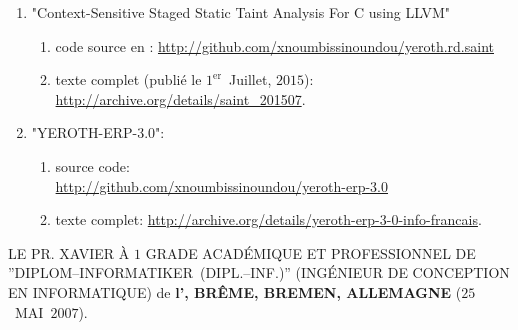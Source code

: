 \begin{enumerate}
	\item "Context-Sensitive Staged Static Taint Analysis
			For C using LLVM"
		\begin{enumerate}[1.]
			\itemsep -0.7em
			\item code source en \cplusplus: \url{http://github.com/xnoumbissinoundou/yeroth.rd.saint}
			\item texte complet (publié le $1^\text{er}$~Juillet, $2015$): \url{http://archive.org/details/saint_201507}.
		\end{enumerate}		 

	\item "YEROTH-ERP-3.0":
			\begin{enumerate}[1.]
			\itemsep -0.7em
			\item source code: \\
			\url{http://github.com/xnoumbissinoundou/yeroth-erp-3.0}
			\item texte complet:
				\url{http://archive.org/details/yeroth-erp-3-0-info-francais}.
		\end{enumerate}	
\end{enumerate}


LE PR. XAVIER À $1$ GRADE ACADÉMIQUE ET PROFESSIONNEL
DE ''DIPLOM--INFORMATIKER~(DIPL.--INF.)''
(INGÉNIEUR DE CONCEPTION EN INFORMATIQUE) de
\textbf{l'\bremenu, BRÊME, BREMEN, ALLEMAGNE}
($25$~MAI~$2007$).

